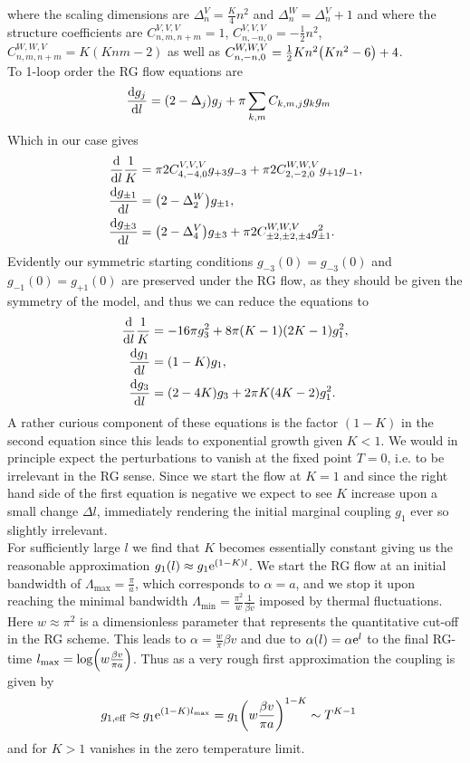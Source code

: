 \documentclass[english, parskip=full]{scrartcl}
\begin{document}
where the scaling dimensions are $\Delta^V_n = \frac{K}{4}n^2$ and $\Delta^W_n = \Delta^V_n+1$ and where the  structure coefficients are $C^{V,V,V}_{n,m,n+m} = 1$, $C^{V,V,V}_{n,-n,0}=-\frac{1}{2}n^2$, $C^{W,W,V}_{n,m,n+m}=K(Knm-2)$ as well as $C^{W,W,V}_{n,-n,0} = \frac{1}{2}Kn^2 \kla*{Kn^2 - 6} + 4$.\\
To 1-loop order the RG flow equations are
\begin{align}
\frac{\d g_j}{\d l} &= \kla*{2-\Delta_j}g_j + \pi \sum_{k,m} C_{k,m,j} g_k g_m
\end{align}
Which in our case gives
\begin{align}
\frac{\d}{\d l} \frac{1}{K} &= \pi 2C^{V,V,V}_{4,-4,0} g_{+3} g_{-3} + \pi 2C^{W,W,V}_{2,-2,0} g_{+1} g_{-1},\\
\frac{\d g_{\pm 1}}{\d l} &= \kla*{2 - \Delta^W_2} g_{\pm 1},\\
\frac{\d g_{\pm 3}}{\d l} &= \kla*{2 - \Delta^V_4} g_{\pm 3} + \pi 2C^{W,W,V}_{\pm 2,\pm 2,\pm 4} g_{\pm 1}^2.
\end{align}
Evidently our symmetric starting conditions $g_{-3}(0) = g_{-3}(0)$ and $g_{-1}(0) = g_{+1}(0)$ are preserved under the RG flow, as they should be given the symmetry of the model, and thus we can reduce the equations to
\begin{align}
\frac{\d }{\d l} \frac{1}{K} &= -16\pi g_3^2 + 8\pi \kla*{K-1} \kla*{2K - 1} g_1^2,\\
\frac{\d g_1}{\d l} &= \kla*{1 - K} g_1,\\
\frac{\d g_3}{\d l} &= \kla*{2 - 4K} g_3 + 2\pi K(4K-2) g_1^2.
\end{align}
A rather curious component of these equations is the factor $(1-K)$ in the second equation since this leads to exponential growth given $K<1$.
We would in principle expect the perturbations to vanish at the fixed point $T=0$, i.e. to be irrelevant in the RG sense.
Since we start the flow at $K=1$ and since the right hand side of the first equation is negative we expect to see $K$ increase upon a small change $\Delta l$, immediately rendering the initial marginal coupling $g_1$ ever so slightly irrelevant.
\\
For sufficiently large $l$ we find that $K$ becomes essentially constant giving us the reasonable approximation $g_1(l) \approx g_1 \text{e}^{(1-K)l}$.
We start the RG flow at an initial bandwidth of $\Lambda_\text{max}=\frac{\pi}{a}$, which corresponds to $\alpha=a$, and we stop it upon reaching the minimal bandwidth $\Lambda_\text{min}=\frac{\pi^2}{w} \frac{1}{\beta v}$ imposed by thermal fluctuations.
Here $w\approx \pi^2$ is a dimensionless parameter that represents the quantitative cut-off in the RG scheme.
This leads to $\alpha=\frac{w}{\pi}\beta v$ and due to $\alpha(l)=\alpha \text{e}^{l}$ to the final RG-time $l_\text{max} = \log \kla*{w\frac{\beta v}{\pi a}}$.
Thus as a very rough first approximation the coupling is given by
\begin{align}
g_{1,\text{eff}} &\approx g_1 \powe{(1-K)l_\text{max}} = g_1 \kla*{w\frac{\beta v}{\pi a}}^{1-K} \sim T^{K-1}
\end{align}
and for $K>1$ vanishes in the zero temperature limit.
\end{document}
